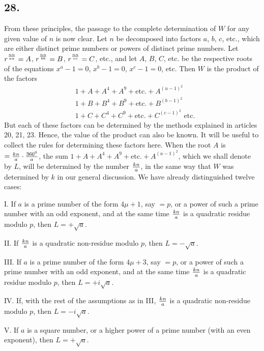 \documentclass[twoside,12pt]{memoir}
\let\oldfrac\frac
\def\frac#1#2{\mathchoice{\tfrac{#1}{#2}}{\oldfrac{#1}{#2}}{\genfrac{}{}{}{2}{#1}{#2\mathstrut}}{\genfrac{}{}{}{3}{#1}{#2\mathstrut}}}
\begin{document}
\subsection*{28.}
 
From these principles, the passage to the complete determination of \(W\) for any given value of \(n\) is now clear. Let \(n\) be decomposed into factors \pagebreak%
\(a\), \(b\), \(c\), etc{.}, which are either distinct prime numbers or powers of distinct prime numbers. Let \(r^{\frac{n n}{a a}}=A\), \(r^{\frac{n n}{b b}}=B\), \(r^{\frac{n n}{c c}}=C\), etc{.}, and let \(A\), \(B\), \(C\), etc{.} be the respective roots of the equations \(x^{a}-1=0\), \(x^{b}-1=0\), \(x^{c}-1=0\), etc{.} Then \(W\) is the product of the factors
\[\begin{aligned}
& 1+A+A^{4}+A^{9}+\text{etc{.}}+A^{(u-1)^{2}} \\
& 1+B+B^{4}+B^{9}+\text{etc{.}}+B^{(b-1)^{2}} \\
& 1+C+C^{4}+C^{9}+\text{etc{.}}+C^{(c-1)^{2}} \text{ etc{.}}
\end{aligned}\]
But each of these factors can be determined by the methods explained in articles 20, 21, 23. Hence, the value of the product can also be known. It will be useful to collect the rules for determining these factors here.  When the root \(A\) is \(=\frac{k n}{a} \cdot \frac{360^{0}}{a}\), the sum \(1+A+A^{4}+A^{9}+\text{etc{.}}+A^{(a-1)^{2}}\), which we shall denote by \(L\), will be determined by the number \(\frac{k n}{a}\), in the same way that \(W\) was determined by \(k\) in our general discussion. We have already distinguished twelve cases:

I. If \(a\) is a prime number of the form \(4 \mu+1\), say \(=p\), or a power of such a prime number with an odd exponent, and at the same time \(\frac{k n}{a}\) is a quadratic residue modulo \(p\), then \(L=+\sqrt{a}\).

II. If \(\frac{k n}{a}\) is a quadratic non-residue modulo \(p\), then \(L=-\sqrt{a}\).

III. If \(a\) is a prime number of the form \(4 \mu+3\), say \(=p\), or a power of such a prime number with an odd exponent, and at the same time \(\frac{k n}{a}\) is a quadratic residue modulo \(p\), then \(L=+i \sqrt{a}\).

IV. If, with the rest of the assumptions as in III, \(\frac{k n}{a}\) is a quadratic non-residue modulo \(p\), then \(L=-i \sqrt{a}\).

V. If \(a\) is a square number, or a higher power of a prime number (with an even exponent), then \(L=+\sqrt{a}\).
\end{document}
